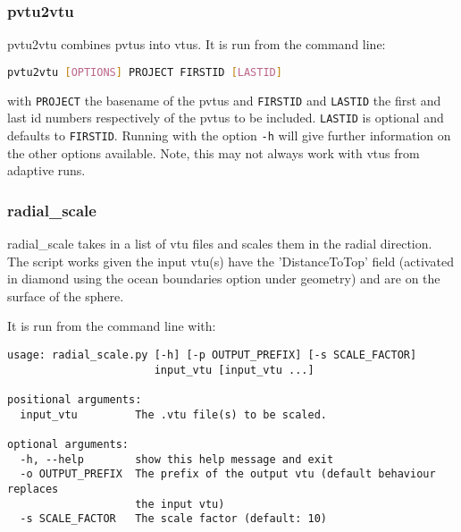 \subsubsection{pvtu2vtu}
\label{sec:pvtu2vtu}
pvtu2vtu combines pvtus into vtus. It is run from the command line:
\begin{lstlisting}[language = Bash]
pvtu2vtu [OPTIONS] PROJECT FIRSTID [LASTID]
\end{lstlisting} 
with \lstinline[language = Bash]+PROJECT+ the basename of the pvtus and \lstinline[language = Bash]+FIRSTID+ and \lstinline[language = Bash]+LASTID+ the first and last id numbers respectively of the pvtus to be included. \lstinline[language = Bash]+LASTID+ is optional and defaults to \lstinline[language = Bash]+FIRSTID+. Running with the option \lstinline[language = Bash]+-h+ will give further information on the other options available. Note, this may not always work with vtus from adaptive runs.


\subsubsection{radial\_scale}
\label{sec:radscal}
radial\_scale takes in a list of vtu files and scales them in the radial direction. The script works given the input vtu(s) have the 'DistanceToTop' field (activated in diamond using the ocean boundaries option under geometry) and are on the surface of the sphere.

It is run from the command line with:
\begin{lstlisting}
usage: radial_scale.py [-h] [-p OUTPUT_PREFIX] [-s SCALE_FACTOR]
                       input_vtu [input_vtu ...]

positional arguments:
  input_vtu         The .vtu file(s) to be scaled.

optional arguments:
  -h, --help        show this help message and exit
  -o OUTPUT_PREFIX  The prefix of the output vtu (default behaviour replaces
                    the input vtu)
  -s SCALE_FACTOR   The scale factor (default: 10)
\end{lstlisting}


